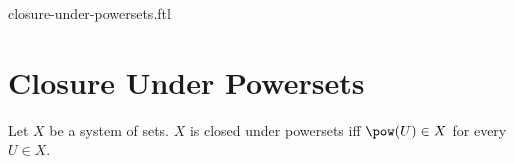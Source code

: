 \documentclass{naproche-library}
\begin{document}
\begin{smodule}{closure-under-powersets.ftl}

  \section*{Closure Under Powersets}

  \begin{definition}[forthel,id=FOUNDATIONS_14_4652013578120594]
    Let $X$ be a system of sets.
    $X$ is closed under powersets iff $\pow(U) \in X$ for every $U \in X$.
  \end{definition}
\end{smodule}
\end{document}
